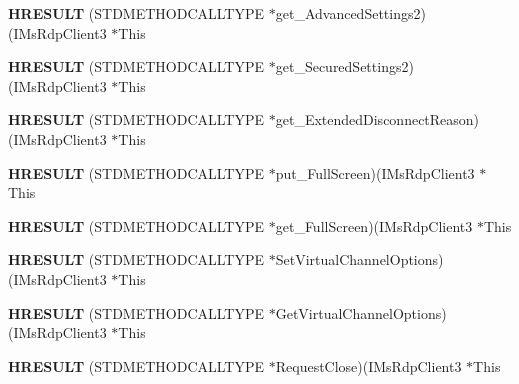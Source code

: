 \begin{DoxyCompactItemize}
{\bfseries H\+R\+E\+S\+U\+LT} (S\+T\+D\+M\+E\+T\+H\+O\+D\+C\+A\+L\+L\+T\+Y\+PE $\ast$get\+\_\+\+Advanced\+Settings2)(I\+Ms\+Rdp\+Client3 $\ast$This
\item 
\mbox{\label{struct_i_ms_rdp_client3_vtbl_a363f91ee42b80d87ef024870c63c546a}} 
{\bfseries H\+R\+E\+S\+U\+LT} (S\+T\+D\+M\+E\+T\+H\+O\+D\+C\+A\+L\+L\+T\+Y\+PE $\ast$get\+\_\+\+Secured\+Settings2)(I\+Ms\+Rdp\+Client3 $\ast$This
\item 
\mbox{\label{struct_i_ms_rdp_client3_vtbl_aa09d698b6ef1d113b2ad5c6cdd9af89f}} 
{\bfseries H\+R\+E\+S\+U\+LT} (S\+T\+D\+M\+E\+T\+H\+O\+D\+C\+A\+L\+L\+T\+Y\+PE $\ast$get\+\_\+\+Extended\+Disconnect\+Reason)(I\+Ms\+Rdp\+Client3 $\ast$This
\item 
\mbox{\label{struct_i_ms_rdp_client3_vtbl_a5eb7000401897ad44ba1b8d67bb9c23d}} 
{\bfseries H\+R\+E\+S\+U\+LT} (S\+T\+D\+M\+E\+T\+H\+O\+D\+C\+A\+L\+L\+T\+Y\+PE $\ast$put\+\_\+\+Full\+Screen)(I\+Ms\+Rdp\+Client3 $\ast$This
\item 
\mbox{\label{struct_i_ms_rdp_client3_vtbl_a79ea0b1c4d0752253913b0dae650ee1b}} 
{\bfseries H\+R\+E\+S\+U\+LT} (S\+T\+D\+M\+E\+T\+H\+O\+D\+C\+A\+L\+L\+T\+Y\+PE $\ast$get\+\_\+\+Full\+Screen)(I\+Ms\+Rdp\+Client3 $\ast$This
\item 
\mbox{\label{struct_i_ms_rdp_client3_vtbl_a67b83ecc261f691ffeb75551e98d4f06}} 
{\bfseries H\+R\+E\+S\+U\+LT} (S\+T\+D\+M\+E\+T\+H\+O\+D\+C\+A\+L\+L\+T\+Y\+PE $\ast$Set\+Virtual\+Channel\+Options)(I\+Ms\+Rdp\+Client3 $\ast$This
\item 
\mbox{\label{struct_i_ms_rdp_client3_vtbl_a25a699f2021c4555de609688e593d69f}} 
{\bfseries H\+R\+E\+S\+U\+LT} (S\+T\+D\+M\+E\+T\+H\+O\+D\+C\+A\+L\+L\+T\+Y\+PE $\ast$Get\+Virtual\+Channel\+Options)(I\+Ms\+Rdp\+Client3 $\ast$This
\item 
\mbox{\label{struct_i_ms_rdp_client3_vtbl_ad5160d71b521f2ad7f7e422e1659b30d}} 
{\bfseries H\+R\+E\+S\+U\+LT} (S\+T\+D\+M\+E\+T\+H\+O\+D\+C\+A\+L\+L\+T\+Y\+PE $\ast$Request\+Close)(I\+Ms\+Rdp\+Client3 $\ast$This
\item 

\end{DoxyCompactItemize}
